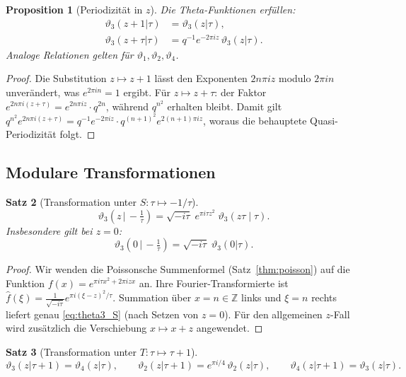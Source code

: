 \documentclass[12pt,a4paper]{amsart}
\newtheorem{theorem}{Satz}[section]
\newtheorem{proposition}[theorem]{Proposition}
\theoremstyle{definition}
\begin{document}
\begin{proposition}[Periodizität in $z$]\label{prop:period_z}
Die Theta-Funktionen erfüllen:
\begin{align}
  \vartheta_3(z+1|\tau) &= \vartheta_3(z|\tau),\\
  \vartheta_3(z+\tau|\tau) &= q^{-1} e^{-2\pi iz}\, \vartheta_3(z|\tau).
\end{align}
Analoge Relationen gelten für $\vartheta_1, \vartheta_2, \vartheta_4$.
\end{proposition}

\begin{proof}
Die Substitution $z \mapsto z+1$ lässt den Exponenten $2n\pi iz$ modulo $2\pi in$
unverändert, was $e^{2\pi in} = 1$ ergibt.
Für $z \mapsto z + \tau$: der Faktor $e^{2n\pi i(z+\tau)} = e^{2n\pi iz}\cdot q^{2n}$,
während $q^{n^2}$ erhalten bleibt. Damit gilt
$q^{n^2} e^{2n\pi i(z+\tau)} = q^{-1}e^{-2\pi iz} \cdot q^{(n+1)^2} e^{2(n+1)\pi iz}$,
woraus die behauptete Quasi-Periodizität folgt.
\end{proof}

\subsection{Modulare Transformationen}

\begin{theorem}[Transformation unter $S: \tau \mapsto -1/\tau$]\label{thm:S_transform}
\[
  \vartheta_3\!\left(z \,\Big|\, -\tfrac{1}{\tau}\right)
  = \sqrt{-i\tau}\; e^{\pi i \tau z^2}\; \vartheta_3(z\tau \mid \tau).
\]
Insbesondere gilt bei $z = 0$:
\begin{equation}\label{eq:theta3_S}
  \vartheta_3\!\left(0 \,\Big|\, -\tfrac{1}{\tau}\right)
  = \sqrt{-i\tau}\; \vartheta_3(0|\tau).
\end{equation}
\end{theorem}

\begin{proof}
Wir wenden die Poissonsche Summenformel (Satz~\ref{thm:poisson}) auf die Funktion
$f(x) = e^{\pi i\tau x^2 + 2\pi i z x}$ an.
Ihre Fourier-Transformierte ist $\hat{f}(\xi) = \tfrac{1}{\sqrt{-i\tau}} e^{\pi i(\xi-z)^2/\tau}$.
Summation über $x = n \in \mathbb{Z}$ links und $\xi = n$ rechts liefert
genau \eqref{eq:theta3_S} (nach Setzen von $z=0$).
Für den allgemeinen $z$-Fall wird zusätzlich die Verschiebung $x \mapsto x + z$ angewendet.
\end{proof}

\begin{theorem}[Transformation unter $T: \tau \mapsto \tau+1$]\label{thm:T_transform}
\[
  \vartheta_3(z|\tau+1) = \vartheta_4(z|\tau),
  \qquad
  \vartheta_2(z|\tau+1) = e^{\pi i/4}\, \vartheta_2(z|\tau),
  \qquad
  \vartheta_4(z|\tau+1) = \vartheta_3(z|\tau).
\]
\end{theorem}
\end{document}
